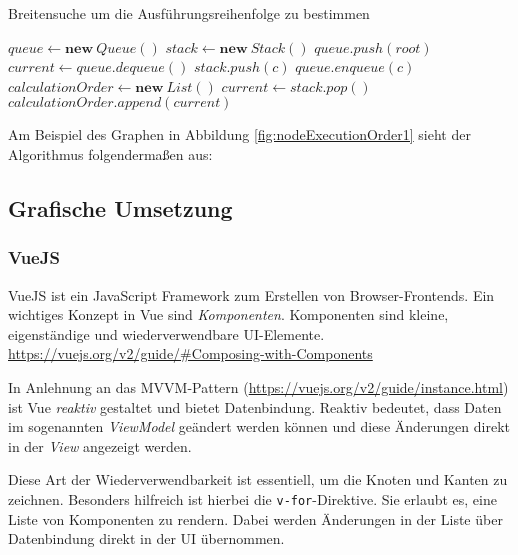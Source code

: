 \begin{algorithm}[H]
    \caption{Breitensuche um die Ausführungsreihenfolge zu bestimmen}
    \begin{algorithmic}[1]
        \State $queue \gets \textbf{new} \ Queue()$
        \State $stack \gets \textbf{new} \ Stack()$
        \State $queue.push(root)$
            \State $current \gets queue.dequeue()$
                \State $stack.push(c)$
                \State $queue.enqueue(c)$
            \EndFor
        \EndWhile
        \State $calculationOrder \gets \textbf{new} \ List()$
            \State $current \gets stack.pop()$
                \State $calculationOrder.append(current)$
            \EndIf
        \EndWhile
    \end{algorithmic}
\end{algorithm}

Am Beispiel des Graphen in Abbildung \ref{fig:nodeExecutionOrder1} sieht der Algorithmus folgendermaßen aus:

\todo{}

\subsection{Grafische Umsetzung}

\subsubsection{VueJS}
VueJS ist ein JavaScript Framework zum Erstellen von Browser-Frontends. Ein wichtiges Konzept in Vue sind \textit{Komponenten}. Komponenten sind kleine, eigenständige und wiederverwendbare UI-Elemente. \url{https://vuejs.org/v2/guide/#Composing-with-Components}

In Anlehnung an das MVVM-Pattern (\url{https://vuejs.org/v2/guide/instance.html}) ist Vue \textit{reaktiv} gestaltet und bietet Datenbindung. Reaktiv bedeutet, dass Daten im sogenannten \textit{ViewModel} geändert werden können und diese Änderungen direkt in der \textit{View} angezeigt werden. 

Diese Art der Wiederverwendbarkeit ist essentiell, um die Knoten und Kanten zu zeichnen. Besonders hilfreich ist hierbei die \texttt{v-for}-Direktive. Sie erlaubt es, eine Liste von Komponenten zu rendern. Dabei werden Änderungen in der Liste über Datenbindung direkt in der UI übernommen. 



